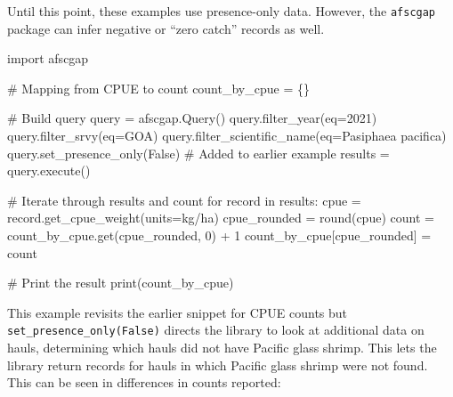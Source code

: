 \documentclass[
  letterpaper,
  oneside,
  open=any]{scrbook}
\newenvironment{Shaded}{\begin{snugshade}}{\end{snugshade}}
\newcommand{\AttributeTok}[1]{\textcolor[rgb]{0.40,0.45,0.13}{#1}}
\newcommand{\CommentTok}[1]{\textcolor[rgb]{0.37,0.37,0.37}{#1}}
\newcommand{\ControlFlowTok}[1]{\textcolor[rgb]{0.00,0.23,0.31}{#1}}
\newcommand{\DecValTok}[1]{\textcolor[rgb]{0.68,0.00,0.00}{#1}}
\newcommand{\FunctionTok}[1]{\textcolor[rgb]{0.28,0.35,0.67}{#1}}
\newcommand{\NormalTok}[1]{\textcolor[rgb]{0.00,0.23,0.31}{#1}}
\newcommand{\OtherTok}[1]{\textcolor[rgb]{0.00,0.23,0.31}{#1}}
\newcommand{\SpecialCharTok}[1]{\textcolor[rgb]{0.37,0.37,0.37}{#1}}
\newcommand{\StringTok}[1]{\textcolor[rgb]{0.13,0.47,0.30}{#1}}
\begin{document}
Until this point, these examples use presence-only data. However, the
\texttt{afscgap} package can infer negative or ``zero catch'' records as
well.

\begin{Shaded}
\begin{Highlighting}[]
\NormalTok{import afscgap}

\CommentTok{\# Mapping from CPUE to count}
\NormalTok{count\_by\_cpue }\OtherTok{=}\NormalTok{ \{\}}

\CommentTok{\# Build query}
\NormalTok{query }\OtherTok{=} \FunctionTok{afscgap.Query}\NormalTok{()}
\FunctionTok{query.filter\_year}\NormalTok{(}\AttributeTok{eq=}\DecValTok{2021}\NormalTok{)}
\FunctionTok{query.filter\_srvy}\NormalTok{(}\AttributeTok{eq=}\StringTok{\textquotesingle{}GOA\textquotesingle{}}\NormalTok{)}
\FunctionTok{query.filter\_scientific\_name}\NormalTok{(}\AttributeTok{eq=}\StringTok{\textquotesingle{}Pasiphaea pacifica\textquotesingle{}}\NormalTok{)}
\FunctionTok{query.set\_presence\_only}\NormalTok{(False)  }\CommentTok{\# Added to earlier example}
\NormalTok{results }\OtherTok{=} \FunctionTok{query.execute}\NormalTok{()}

\CommentTok{\# Iterate through results and count}
\ControlFlowTok{for}\NormalTok{ record }\ControlFlowTok{in}\NormalTok{ results}\SpecialCharTok{:}
\NormalTok{  cpue }\OtherTok{=} \FunctionTok{record.get\_cpue\_weight}\NormalTok{(}\AttributeTok{units=}\StringTok{\textquotesingle{}kg/ha\textquotesingle{}}\NormalTok{)}
\NormalTok{  cpue\_rounded }\OtherTok{=} \FunctionTok{round}\NormalTok{(cpue)}
\NormalTok{  count }\OtherTok{=} \FunctionTok{count\_by\_cpue.get}\NormalTok{(cpue\_rounded, }\DecValTok{0}\NormalTok{) }\SpecialCharTok{+} \DecValTok{1}
\NormalTok{  count\_by\_cpue[cpue\_rounded] }\OtherTok{=}\NormalTok{ count}

\CommentTok{\# Print the result}
\FunctionTok{print}\NormalTok{(count\_by\_cpue)}
\end{Highlighting}
\end{Shaded}

This example revisits the earlier snippet for CPUE counts but
\texttt{set\_presence\_only(False)} directs the library to look at
additional data on hauls, determining which hauls did not have Pacific
glass shrimp. This lets the library return records for hauls in which
Pacific glass shrimp were not found. This can be seen in differences in
counts reported:
\end{document}
